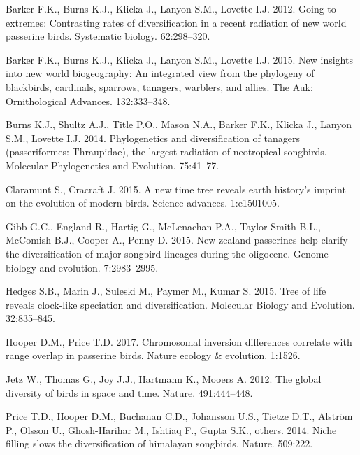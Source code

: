 \leavevmode\hypertarget{ref-barker2012going}{}%
Barker F.K., Burns K.J., Klicka J., Lanyon S.M., Lovette I.J. 2012. Going to extremes: Contrasting rates of diversification in a recent radiation of new world passerine birds. Systematic biology. 62:298--320.

\leavevmode\hypertarget{ref-barker2015new}{}%
Barker F.K., Burns K.J., Klicka J., Lanyon S.M., Lovette I.J. 2015. New insights into new world biogeography: An integrated view from the phylogeny of blackbirds, cardinals, sparrows, tanagers, warblers, and allies. The Auk: Ornithological Advances. 132:333--348.

\leavevmode\hypertarget{ref-burns2014phylogenetics}{}%
Burns K.J., Shultz A.J., Title P.O., Mason N.A., Barker F.K., Klicka J., Lanyon S.M., Lovette I.J. 2014. Phylogenetics and diversification of tanagers (passeriformes: Thraupidae), the largest radiation of neotropical songbirds. Molecular Phylogenetics and Evolution. 75:41--77.

\leavevmode\hypertarget{ref-claramunt2015new}{}%
Claramunt S., Cracraft J. 2015. A new time tree reveals earth history's imprint on the evolution of modern birds. Science advances. 1:e1501005.

\leavevmode\hypertarget{ref-gibb2015new}{}%
Gibb G.C., England R., Hartig G., McLenachan P.A., Taylor Smith B.L., McComish B.J., Cooper A., Penny D. 2015. New zealand passerines help clarify the diversification of major songbird lineages during the oligocene. Genome biology and evolution. 7:2983--2995.

\leavevmode\hypertarget{ref-Hedges2015}{}%
Hedges S.B., Marin J., Suleski M., Paymer M., Kumar S. 2015. Tree of life reveals clock-like speciation and diversification. Molecular Biology and Evolution. 32:835--845.

\leavevmode\hypertarget{ref-hooper2017chromosomal}{}%
Hooper D.M., Price T.D. 2017. Chromosomal inversion differences correlate with range overlap in passerine birds. Nature ecology \& evolution. 1:1526.

\leavevmode\hypertarget{ref-Jetz2012}{}%
Jetz W., Thomas G., Joy J.J., Hartmann K., Mooers A. 2012. The global diversity of birds in space and time. Nature. 491:444--448.

\leavevmode\hypertarget{ref-price2014niche}{}%
Price T.D., Hooper D.M., Buchanan C.D., Johansson U.S., Tietze D.T., Alström P., Olsson U., Ghosh-Harihar M., Ishtiaq F., Gupta S.K., others. 2014. Niche filling slows the diversification of himalayan songbirds. Nature. 509:222.

